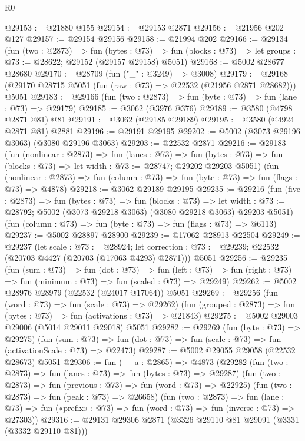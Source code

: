 \begin{lexlean}{R0}
\begin{coremodule}
@29153 := @21880 @155
@29154 := @29153 @2871
@29156 := @21956 @202 @127
@29157 := @29154 @29156
@29158 := @21994 @202
@29166 := @29134
    (fun (two : @2873) =>
    fun (bytes : @73) =>
    fun (blocks : @73) => let groups : @73 := @28622; @29152 (@29157 @29158) @5051)
@29168 := @5002 @28677 @28680
@29170 := @28709 (fun ("_" : @3249) => @3008)
@29179 := @29168 (@29170 @28715 @5051 (fun (raw : @73) => @22532 (@21956 @2871 @28682))) @5051
@29183 := @29166 (fun (two : @2873) => fun (byte : @73) => fun (lane : @73) => @29179)
@29185 := @3062 (@3976 @376)
@29189 := @3580 (@4798 @2871 @81) @81
@29191 := @3062 (@29185 @29189)
@29195 := @3580 (@4924 @2871 @81) @2881
@29196 := @29191 @29195
@29202 := @5002 (@3073 @29196 @3063) (@3080 @29196 @3063)
@29203 := @22532 @2871
@29216 := @29183
    (fun (nonlinear : @2873) =>
    fun (lanes : @73) =>
    fun (bytes : @73) => fun (blocks : @73) => let width : @73 := @28747; @29202 @29203 @5051)
    (fun (nonlinear : @2873) =>
    fun (column : @73) => fun (byte : @73) => fun (flags : @73) => @4878)
@29218 := @3062 @29189 @29195
@29235 := @29216
    (fun (five : @2873) =>
    fun (bytes : @73) =>
    fun (blocks : @73) =>
    let width : @73 := @28792; @5002 (@3073 @29218 @3063) (@3080 @29218 @3063) @29203 @5051)
    (fun (column : @73) => fun (byte : @73) => fun (flags : @73) => @6113)
@29237 := @5002 @28897 @28900
@29239 := @17062 @28913 @22504
@29249 := @29237
    (let scale : @73 := @28924;
    let correction : @73 := @29239; @22532 (@20703 @4427 (@20703 (@17063 @4293) @2871)))
    @5051
@29256 := @29235
    (fun (sum : @73) =>
    fun (dot : @73) =>
    fun (left : @73) => fun (right : @73) => fun (minimum : @73) => fun (scaled : @73) => @29249)
@29262 := @5002 @28976 @28979 (@22532 (@24017 @17064)) @5051
@29269 := @29256
    (fun (word : @73) => fun (scale : @73) => @29262)
    (fun (grouped : @2873) => fun (bytes : @73) => fun (activations : @73) => @21843)
@29275 := @5002 @29003 @29006 (@5014 @29011 @29018) @5051
@29282 := @29269
    (fun (byte : @73) => @29275)
    (fun (sum : @73) =>
    fun (dot : @73) => fun (scale : @73) => fun (activationScale : @73) => @22473)
@29287 := @5002 @29055 @29058 (@22532 @28673) @5051
@29306 := fun (__a : @2865) =>
  @4873
    (@29282
      (fun (two : @2873) => fun (lanes : @73) => fun (bytes : @73) => @29287)
      (fun (two : @2873) => fun (previous : @73) => fun (word : @73) => @22925)
      (fun (two : @2873) => fun (peak : @73) => @26658)
      (fun (two : @2873) =>
      fun (lane : @73) =>
      fun («prefix» : @73) => fun (word : @73) => fun (inverse : @73) => @27303))
@29316 := @29131 @29306 @2871 (@3326 @29110 @81 @29091 (@3331 (@3332 @29110 @81)))

\end{coremodule}
\end{lexlean}
